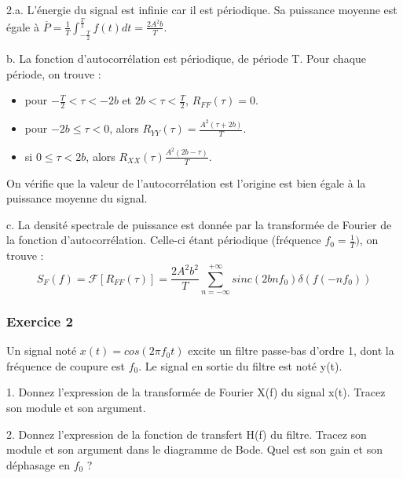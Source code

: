 \documentclass[11pt]{report}
\begin{document}
	\vspace{0.5\baselineskip}
	
	2.a. L'énergie du signal est infinie car il est périodique. Sa puissance moyenne est égale à $\overline{P}=\frac{1}{T}\int_{-\frac{T}{2}}^{\frac{T}{2}}f(t)dt=\frac{2A^{2}b}{T}$. 

	b. La fonction d'autocorrélation est périodique, de période T. Pour chaque période, on trouve :
	\begin{itemize}
		\item pour $-\frac{T}{2}<\tau<-2b$ et $2b<\tau<\frac{T}{2}$,  $R_{FF}(\tau)=0$.
		\item pour $-2b \leq \tau < 0$, alors $R_{YY}(\tau)=\frac{A^{2}(\tau+2b)}{T}$.
		\item si $0 \leq \tau < 2b$, alors $R_{XX}(\tau)\frac{A^{2}(2b-\tau)}{T}$. 
	\end{itemize}
	On vérifie que la valeur de l'autocorrélation est l'origine est bien égale à la puissance moyenne du signal.
	
	\vspace{0.5\baselineskip}
	
	c. La densité spectrale de puissance est donnée par la transformée de Fourier de la fonction d'autocorrélation. Celle-ci étant périodique (fréquence $f_{0}=\frac{1}{T})$, on trouve :
	\begin{equation*}
	S_{F}(f)=\mathcal{F}[R_{FF}(\tau)]=\frac{2A^{2}b^{2}}{T}\sum_{n=-\infty}^{+\infty}sinc(2bnf_{0})\delta(f(-nf_{0}))
	\end{equation*}
	
	
	\vspace{1\baselineskip}	
	
	\subsubsection{Exercice 2}
	
	Un signal noté $x(t)=cos(2\pi f_{0}t)$ excite un filtre passe-bas d'ordre 1, dont la fréquence de coupure est $f_{0}$. Le signal en sortie du filtre est noté y(t).
	
	\vspace{0.5\baselineskip}	
	
	1. Donnez l'expression de la transformée de Fourier X(f) du signal x(t). Tracez son module et son argument.
	
	\vspace{0.5\baselineskip}
	
	2. Donnez l'expression de la fonction de transfert H(f) du filtre. Tracez son module et son argument dans le diagramme de Bode. Quel est son gain et son déphasage en $f_{0}$ ?
	
\end{document}

